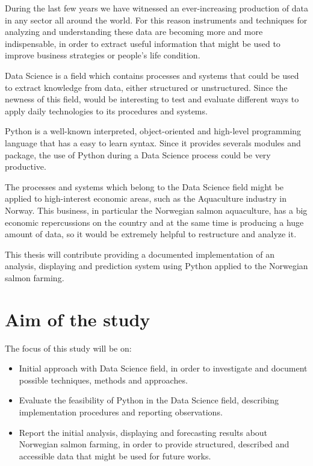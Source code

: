 

During the last few years we have witnessed an ever-increasing production of data in any sector all around the world.
For this reason instruments and techniques for analyzing and understanding these data are becoming more and more indispensable, in order to extract useful information that might be used to improve business strategies or people's life condition.

Data Science is a field which contains processes and systems that could be used to extract knowledge from data, either structured or unstructured. Since the newness of this field, would be interesting to test and evaluate different ways to apply daily technologies to its procedures and systems.

Python is a well-known interpreted, object-oriented and high-level programming language that has a easy to learn syntax.
Since it provides severals modules and package, the use of Python during a Data Science process could be very productive.

The processes and systems which belong to the Data Science field might be applied to high-interest  economic areas, such as the Aquaculture industry in Norway.
This business, in particular the Norwegian salmon aquaculture, has a big economic repercussions on the country and at the same time is producing a huge amount of data, so it would be extremely helpful to restructure and analyze it.

This thesis will contribute providing a documented implementation of an analysis, displaying and prediction system using Python applied to the Norwegian salmon farming.

\newpage

\section{Aim of the study}
\vspace{-5mm}
The focus of this study will be on:
\begin{itemize} 
 \item Initial approach with Data Science field, in order to investigate and document possible techniques, methods and approaches.
 
 \item Evaluate the feasibility of Python in the Data Science field, describing implementation procedures and reporting observations. 
  
 \item Report the initial analysis, displaying and forecasting results about Norwegian salmon farming, in order to provide structured, described and accessible data that might be used for future works.


\end{itemize}

